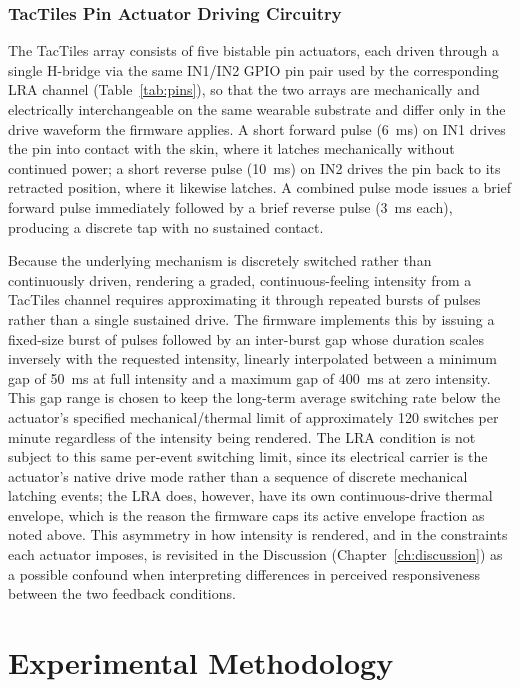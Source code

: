 \documentclass[12pt, a4paper]{report}
\begin{document}
\subsection{TacTiles Pin Actuator Driving Circuitry}
The TacTiles array consists of five bistable pin actuators, each driven through a single H-bridge via the same IN1/IN2 GPIO pin pair used by the corresponding LRA channel (Table~\ref{tab:pins}), so that the two arrays are mechanically and electrically interchangeable on the same wearable substrate and differ only in the drive waveform the firmware applies. A short forward pulse (6~ms) on IN1 drives the pin into contact with the skin, where it latches mechanically without continued power; a short reverse pulse (10~ms) on IN2 drives the pin back to its retracted position, where it likewise latches. A combined pulse mode issues a brief forward pulse immediately followed by a brief reverse pulse (3~ms each), producing a discrete tap with no sustained contact.

Because the underlying mechanism is discretely switched rather than continuously driven, rendering a graded, continuous-feeling intensity from a TacTiles channel requires approximating it through repeated bursts of pulses rather than a single sustained drive. The firmware implements this by issuing a fixed-size burst of pulses followed by an inter-burst gap whose duration scales inversely with the requested intensity, linearly interpolated between a minimum gap of 50~ms at full intensity and a maximum gap of 400~ms at zero intensity. This gap range is chosen to keep the long-term average switching rate below the actuator's specified mechanical/thermal limit of approximately 120 switches per minute regardless of the intensity being rendered. The LRA condition is not subject to this same per-event switching limit, since its electrical carrier is the actuator's native drive mode rather than a sequence of discrete mechanical latching events; the LRA does, however, have its own continuous-drive thermal envelope, which is the reason the firmware caps its active envelope fraction as noted above. This asymmetry in how intensity is rendered, and in the constraints each actuator imposes, is revisited in the Discussion (Chapter~\ref{ch:discussion}) as a possible confound when interpreting differences in perceived responsiveness between the two feedback conditions.

\chapter{Experimental Methodology}
\end{document}
